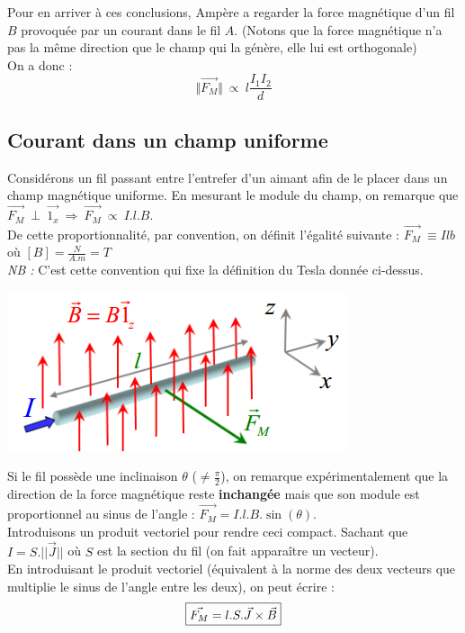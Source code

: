 \documentclass	[11pt, a4paper, openany]{book}
\begin{document}
Pour en arriver à ces conclusions, Ampère a regarder la force magnétique d'un fil $B$ provoquée par un courant dans le fil $A$. (Notons que la force magnétique n'a pas la même direction que le champ qui la génère, elle lui est orthogonale)
\\
On a donc :
\begin{equation}
\Vert \vec{F_M} \Vert\ \propto\ l \frac{I_1 I_2}{d}
\end{equation}

\subsection{Courant dans un champ uniforme}
Considérons un fil passant entre l'entrefer d'un aimant afin de le placer dans un champ magnétique uniforme. En mesurant le module du champ, on remarque que $\vec{F_M}\ \perp\ \vec{1_x}\ \Rightarrow\ \vec{F_M}\ \propto\ I.l.B$.\\
De cette proportionnalité, par convention, on définit l'égalité suivante : $ \vec{F_M}\ \equiv Ilb$ où $[B] = \frac{N}{A.m} = T$\\

\textit{NB :} C'est cette convention qui fixe la définition du Tesla donnée ci-dessus.
\begin{center}
\includegraphics[scale=0.55]{magneto/image1.png}
\end{center}
Si le fil possède une inclinaison $\theta$ ($\neq \frac{\pi}{2}$), on remarque expérimentalement que la direction de la force magnétique reste \textbf{inchangée} mais que son module est proportionnel au sinus de l'angle : $\vec{F_M} = I.l.B.\sin(\theta)$.
\\

Introduisons un produit vectoriel pour rendre ceci compact. Sachant que $I = S.||\vec{J}||$ où $S$ est la section du fil (on fait apparaître un vecteur). \\
En introduisant le produit vectoriel (équivalent à la norme des deux vecteurs que multiplie le sinus de l'angle entre les deux), on peut écrire : 
\begin{equation}
\fbox{$\vec{F_M} = l.S.\vec{J} \times \vec{B} $}
\end{equation}
\end{document}
